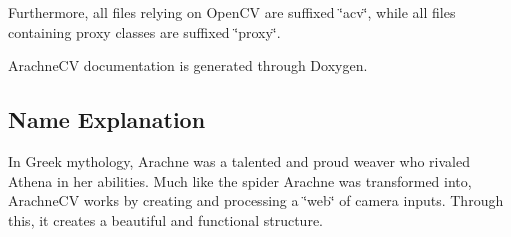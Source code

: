 Furthermore, all files relying on Open\-C\-V are suffixed \char`\"{}acv\char`\"{}, while all files containing proxy classes are suffixed \char`\"{}proxy\char`\"{}.

Arachne\-C\-V documentation is generated through Doxygen.

\subsection*{Name Explanation}

In Greek mythology, Arachne was a talented and proud weaver who rivaled Athena in her abilities. Much like the spider Arachne was transformed into, Arachne\-C\-V works by creating and processing a \char`\"{}web\char`\"{} of camera inputs. Through this, it creates a beautiful and functional structure. 